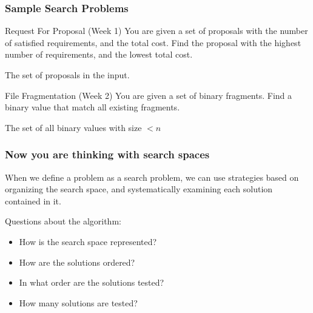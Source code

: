 \documentclass{beamer}
\begin{document}
\begin{frame}
  \frametitle{Sample Search Problems}
  \begin{block}{Request For Proposal (Week 1)}  
    You are given a set of proposals with the number of satisfied
    requirements, and the total cost. \alert{Find} the proposal with
    the highest number of requirements, and the lowest total cost.

    \bigskip

     The set of proposals in the input.
  \end{block}

  \begin{block}{File Fragmentation (Week 2)}
    You are given a set of binary fragments. \alert{Find} a binary
    value that match all existing fragments.

    \bigskip

     The set of all binary values with size $< n$
  \end{block}

\end{frame}


\begin{frame}
  \frametitle{Now you are thinking with search spaces}

  When we define a problem as a search problem, we can use strategies
  based on organizing the search space, and systematically examining
  each solution contained in it.

  \bigskip

  Questions about the algorithm:
  \begin{itemize}
  \item How is the search space represented?
  \item How are the solutions ordered?
  \item In what order are the solutions tested?
  \item How many solutions are tested?
  \end{itemize}
\end{frame}
\end{document}

